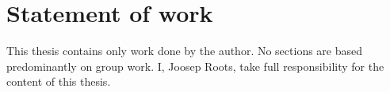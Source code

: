 \chapter{Statement of work}

This thesis contains only work done by the author. 
No sections are based predominantly on group work.
I, Joosep Roots, take full responsibility for the content of this thesis.